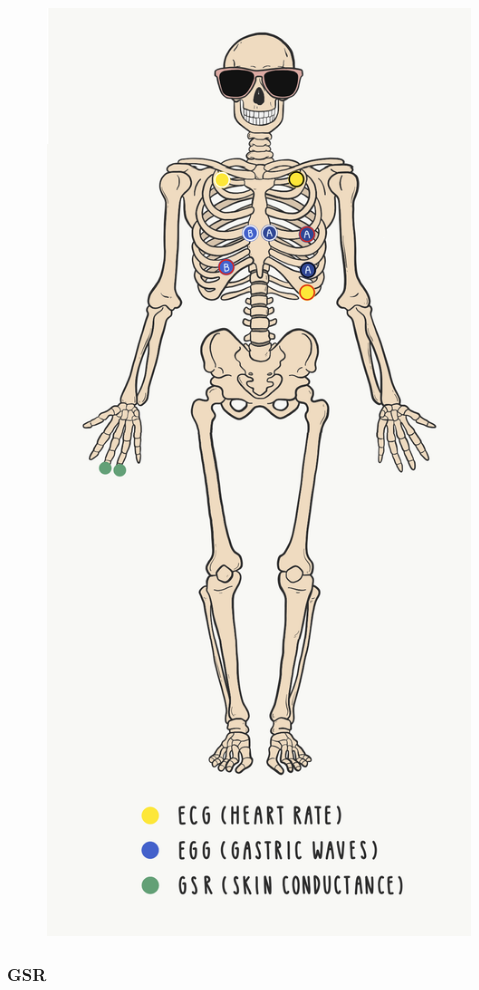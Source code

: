 \documentclass[]{book}
\begin{document}
\begin{figure}
\centering
\includegraphics{images/physiology/1.png}
\caption{}
\end{figure}

\hypertarget{gsr}{%
\subsubsection{GSR}\label{gsr}}
\end{document}
